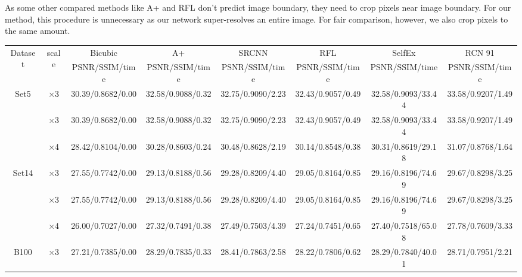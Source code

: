\documentclass[10pt,twocolumn,letterpaper]{article}
\begin{document}
As  some other compared methods like A+ \cite{Timofte} and  RFL \cite{schulter2015fast} don't predict image boundary, they need to crop pixels near image boundary. For our method, this procedure is unnecessary as our network super-resolves an entire image. For fair comparison, however, we also crop pixels to the same amount. \footnotemark{}


\begin{table}
\begin{center}
\setlength{\tabcolsep}{2pt}
\footnotesize
\begin{tabular}{ | c | c | c | c | c | c | c | c | }
\hline
\multirow{2}{*}{Dataset} & \multirow{2}{*}{scale} & Bicubic & A+ & SRCNN & RFL & SelfEx & RCN 91\\
 & & PSNR/SSIM/time & PSNR/SSIM/time & PSNR/SSIM/time & PSNR/SSIM/time & PSNR/SSIM/time & PSNR/SSIM/time\\
\hline
\hline
\multirow{3}{*}{Set5} & $\times$3 & 30.39/0.8682/0.00 & 32.58/0.9088/0.32 & {\color{blue}32.75}/0.9090/2.23 & 32.43/0.9057/0.49 & 32.58/{\color{blue}0.9093}/33.44 & {\color{red}33.58}/{\color{red}0.9207}/1.49\\
 & $\times$3 & 30.39/0.8682/0.00 & 32.58/0.9088/0.32 & {\color{blue}32.75}/0.9090/2.23 & 32.43/0.9057/0.49 & 32.58/{\color{blue}0.9093}/33.44 & {\color{red}33.58}/{\color{red}0.9207}/1.49\\
 & $\times$4 & 28.42/0.8104/0.00 & 30.28/0.8603/0.24 & {\color{blue}30.48}/{\color{blue}0.8628}/2.19 & 30.14/0.8548/0.38 & 30.31/0.8619/29.18 & {\color{red}31.07}/{\color{red}0.8768}/1.64\\
\hline
\hline
\multirow{3}{*}{Set14} & $\times$3 & 27.55/0.7742/0.00 & 29.13/0.8188/0.56 & {\color{blue}29.28}/{\color{blue}0.8209}/4.40 & 29.05/0.8164/0.85 & 29.16/0.8196/74.69 & {\color{red}29.67}/{\color{red}0.8298}/3.25\\
 & $\times$3 & 27.55/0.7742/0.00 & 29.13/0.8188/0.56 & {\color{blue}29.28}/{\color{blue}0.8209}/4.40 & 29.05/0.8164/0.85 & 29.16/0.8196/74.69 & {\color{red}29.67}/{\color{red}0.8298}/3.25\\
 & $\times$4 & 26.00/0.7027/0.00 & 27.32/0.7491/0.38 & {\color{blue}27.49}/0.7503/4.39 & 27.24/0.7451/0.65 & 27.40/{\color{blue}0.7518}/65.08 & {\color{red}27.78}/{\color{red}0.7609}/3.33\\
\hline
\hline
\multirow{3}{*}{B100} & $\times$3 & 27.21/0.7385/0.00 & 28.29/0.7835/0.33 & {\color{blue}28.41}/{\color{blue}0.7863}/2.58 & 28.22/0.7806/0.62 & 28.29/0.7840/40.01 & {\color{red}28.71}/{\color{red}0.7951}/2.21\\

\end{tabular}
\end{center}
\end{table}
\end{document}

